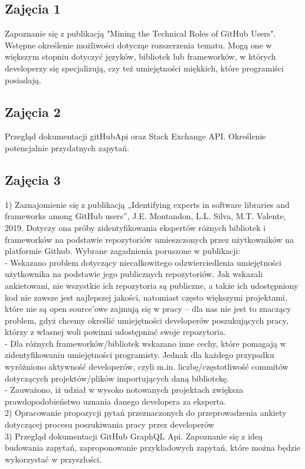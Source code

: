 \documentclass[graybox]{svmult}
\begin{document}
\subsection{Zajęcia 1}

Zapoznanie się z publikacją "Mining the Technical Roles of GitHub Users". Wstępne określenie możliwości dotycząe rozszerzenia tematu. Mogą one w większym stopniu dotyczyć języków, bibliotek lub frameworków, w których developerzy się specjalizują, czy też umiejętności miękkich, które programiści posiadają.
\subsection{Zajęcia 2}
Przegląd dokumentacji gitHubApi oraz Stack Exchange API. Określenie potencjalnie przydatnych zapytań.
\subsection{Zajęcia 3}
1) Zaznajomienie się z publikacją „Identifying experts in software libraries and frameworks among GitHub users”, J.E. Montandon, L.L. Silva, M.T. Valente, 2019. Dotyczy ona próby zidentyfikowania ekspertów różnych bibliotek i frameworków na podstawie repozytoriów umieszczonych przez użytkowników na platformie Github. Wybrane zagadnienia poruszone w publikacji:\\
- Wskazano problem dotyczący niecałkowitego odzwierciedlenia umiejętności użytkownika na podstawie jego publicznych repozytoriów. Jak wskazali ankietowani, nie wszystkie ich repozytoria są publiczne, a także ich udostępniony kod nie zawsze jest najlepszej jakości, natomiast często większymi projektami, które nie są open source’owe zajmują się w pracy – dla nas nie jest to znaczący problem, gdyż chcemy określić umiejętności developerów poszukujących pracy, którzy z własnej woli powinni udostępniać swoje repozytoria.\\
- Dla różnych frameworków/bibliotek wskazano inne cechy, które pomagają w zidentyfikowaniu umiejętności programisty. Jednak dla każdego przypadku wyróżniono aktywność developerów, czyli m.in. liczbę/częstotliwość commitów dotyczących projektów/plików importujących daną bibliotekę.\\
- Zauważono, iż udział w wysoko notowanych projektach zwiększa prawdopodobieństwo uznania danego developera za eksperta.\\
2) Opracowanie propozycji pytań przeznaczonych do przeprowadzenia ankiety dotyczącej procesu poszukiwania pracy przez developerów\\
3) Przegląd dokumentacji GitHub GraphQL Api. Zapoznanie się z ideą budowania zapytań, zaproponowanie przykładowych zapytań, które można będzie wykorzystać w przyszłości.
\end{document}
